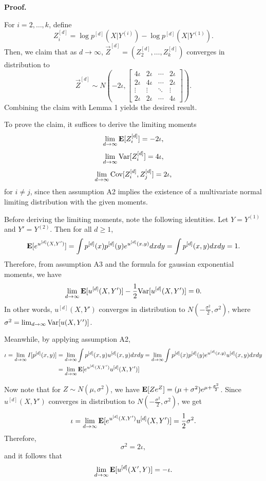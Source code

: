 \textbf{Proof.}

For $i = 2,\hdots, k$, define
\[
Z_i^{[d]} = \log p^{[d]}(X|Y^{(i)}) - \log p^{[d]}(X|Y^{(1)}).
\]
Then, we claim that as $d \to \infty$, $\vec{Z}^{[d]} = (Z_2^{[d]},\hdots, Z_k^{[d]})$ converges in distribution to
\[
\vec{Z}^{[d]} \sim N\left(-2\iota, 
\begin{bmatrix}
4\iota & 2\iota & \cdots & 2\iota\\
2\iota & 4\iota & \cdots & 2\iota\\
\vdots & \vdots & \ddots & \vdots\\
2\iota & 2\iota & \cdots & 4\iota
\end{bmatrix}
\right).
\]
Combining the claim with Lemma 1 yields the
desired result.

To prove the claim, it suffices to derive the limiting moments
\[\lim_{d \to \infty} \textbf{E}[Z_i^{[d]}]= -2\iota,\]
\[\lim_{d \to \infty} \text{Var}[Z_i^{[d]}] = 4\iota,\]
\[\lim_{d \to \infty} \text{Cov}[Z_i^{[d]}, Z_j^{[d]}]= 2\iota,\]
for $i \neq j$,
since then assumption A2 implies the existence of a multivariate normal
limiting distribution with the given moments.

Before deriving the limiting moments, note the following identities.
Let $Y = Y^{(1)}$ and $Y' = Y^{(2)}$.
Then for all $d \geq 1$,
\[
\textbf{E}[e^{u^{[d]}(X, Y')}] = \int p^{[d]}(x) p^{[d]}(y) e^{u^{[d]}(x, y)} dx dy = \int p^{[d]}(x, y) dx dy = 1.
\]
Therefore, from assumption A3 and the formula for gaussian exponential
moments, we have
\[
\lim_{d \to \infty} \textbf{E}[u^{[d]}(X, Y')]-\frac{1}{2}\text{Var}[u^{[d]}(X, Y')] = 0.
\]
In other words, $u^{[d]}(X, Y')$ converges in distribution to $N(-\frac{\sigma^2}{2}, \sigma^2)$,
where $\sigma^2 = \lim_{d \to \infty} \text{Var}[u(X, Y')]$.

Meanwhile, by applying assumption A2,
\begin{align*}
\iota = \lim_{d \to \infty} I[p^{[d]}(x, y)] &= \lim_{d \to \infty} \int p^{[d]}(x, y) u^{[d]}(x, y) dx dy 
= \lim_{d \to \infty} \int p^{[d]}(x) p^{[d]}(y) e^{u^{[d]}(x, y)} u^{[d]}(x, y) dx dy
\\&= \lim_{d \to \infty}  \textbf{E}[e^{u^{[d]}(X, Y')}u^{[d]}(X, Y')]
\end{align*}

Now note that for $Z \sim N(\mu,\sigma^2)$, we have $\textbf{E}[Ze^Z] = (\mu + \sigma^2)e^{\mu + \frac{\sigma^2}{2}}$.
Since $u^{[d]}(X, Y')$ converges in distribution to $N(-\frac{\sigma^2}{2}, \sigma^2)$, we get
\[
\iota =  \lim_{d \to \infty}  \textbf{E}[e^{u^{[d]}(X, Y')}u^{[d]}(X, Y')] = \frac{1}{2}\sigma^2.
\]
Therefore,
\[
\sigma^2 = 2\iota,
\]
and it follows that
\[
\lim_{d \to \infty} \textbf{E}[u^{[d]}(X', Y)] = -\iota.
\]

